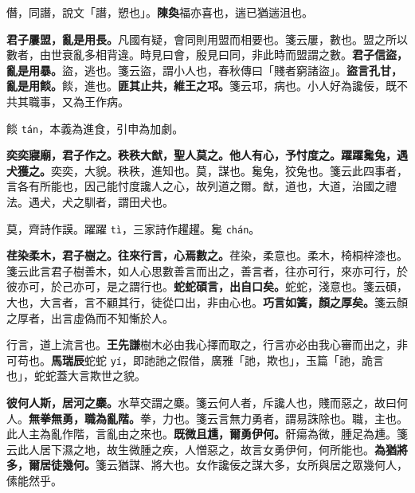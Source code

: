 \begin{quoting}僭，同譖，說文「譖，愬也」。\textbf{陳奐}福亦喜也，遄已猶遄沮也。\end{quoting}

\textbf{君子屢盟，亂是用長。}{\footnotesize 凡國有疑，會同則用盟而相要也。箋云屢，數也。盟之所以數者，由世衰亂多相背違。時見曰會，殷見曰同，非此時而盟謂之數。}\textbf{君子信盜，亂是用暴。}{\footnotesize 盜，逃也。箋云盜，謂小人也，春秋傳曰「賤者窮諸盜」。}\textbf{盜言孔甘，亂是用餤。}{\footnotesize 餤，進也。}\textbf{匪其止共，維王之邛。}{\footnotesize 箋云邛，病也。小人好為讒佞，既不共其職事，又為王作病。}

\begin{quoting}餤 \texttt{tán}，本義為進食，引申為加劇。\end{quoting}

\textbf{奕奕寢廟，君子作之。秩秩大猷，聖人莫之。他人有心，予忖度之。躍躍毚兔，遇犬獲之。}{\footnotesize 奕奕，大貌。秩秩，進知也。莫，謀也。毚兔，狡兔也。箋云此四事者，言各有所能也，因己能忖度讒人之心，故列道之爾。猷，道也，大道，治國之禮法。遇犬，犬之馴者，謂田犬也。}

\begin{quoting}莫，齊詩作謨。躍躍 \texttt{tì}，三家詩作趯趯。毚 \texttt{chán}。\end{quoting}

\textbf{荏染柔木，君子樹之。往來行言，心焉數之。}{\footnotesize 荏染，柔意也。柔木，椅桐梓漆也。箋云此言君子樹善木，如人心思數善言而出之，善言者，往亦可行，來亦可行，於彼亦可，於己亦可，是之謂行也。}\textbf{蛇蛇碩言，出自口矣。}{\footnotesize 蛇蛇，淺意也。箋云碩，大也，大言者，言不顧其行，徒從口出，非由心也。}\textbf{巧言如簧，顏之厚矣。}{\footnotesize 箋云顏之厚者，出言虛偽而不知慚於人。}

\begin{quoting}行言，道上流言也。\textbf{王先謙}樹木必由我心擇而取之，行言亦必由我心審而出之，非可苟也。\textbf{馬瑞辰}蛇蛇 \texttt{yí}，即訑訑之假借，廣雅「訑，欺也」，玉篇「訑，詭言也」，蛇蛇蓋大言欺世之貌。\end{quoting}

\textbf{彼何人斯，居河之麋。}{\footnotesize 水草交謂之麋。箋云何人者，斥讒人也，賤而惡之，故曰何人。}\textbf{無拳無勇，職為亂階。}{\footnotesize 拳，力也。箋云言無力勇者，謂易誅除也。職，主也。此人主為亂作階，言亂由之來也。}\textbf{既微且尰，爾勇伊何。}{\footnotesize 骭瘍為微，腫足為尰。箋云此人居下濕之地，故生微腫之疾，人憎惡之，故言女勇伊何，何所能也。}\textbf{為猶將多，爾居徒幾何。}{\footnotesize 箋云猶謀、將大也。女作讒佞之謀大多，女所與居之眾幾何人，傃能然乎。}


